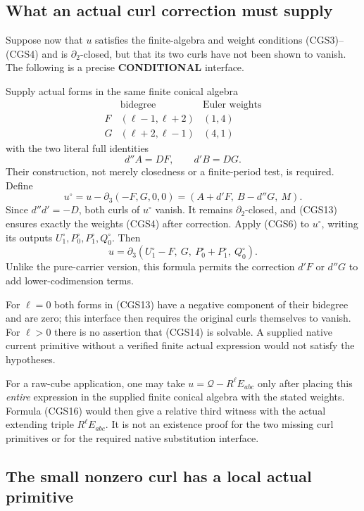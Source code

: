 \subsection{What an actual curl correction must supply}

Suppose now that $u$ satisfies the finite-algebra and weight
conditions (CGS3)--(CGS4) and is $\partial_2$-closed, but that
its two curls have not been shown to vanish.  The following
is a precise \textbf{CONDITIONAL} interface.

Supply actual forms in the same finite conical algebra
\[
 \begin{array}{c|c|c}
       &\text{bidegree}&\text{Euler weights}\\\hline
 F&(\ell-1,\ell+2)&(1,4)\\
 G&(\ell+2,\ell-1)&(4,1)
 \end{array}
 \tag{CGS13}
\]
with the two literal full identities
\[
                         d''A=DF,\qquad d'B=DG.
 \tag{CGS14}
\]
Their construction, not merely closedness or a finite-period
test, is required.  Define
\[
 u^\circ=u-\partial_3(-F,G,0,0)
                       =(A+d'F,\ B-d''G,\ M).
 \tag{CGS15}
\]
Since $d''d'=-D$, both curls of $u^\circ$ vanish.  It remains
$\partial_2$-closed, and (CGS13) ensures exactly the weights
(CGS4) after correction.  Apply (CGS6) to $u^\circ$, writing
its outputs $U_1^\circ,P_0^\circ,P_1^\circ,Q_0^\circ$.
Then
\[
 \boxed{\quad
 u=\partial_3\left(
 U_1^\circ-F,\ G,\ P_0^\circ+P_1^\circ,\ Q_0^\circ
                  \right).
 \quad}
 \tag{CGS16}
\]
Unlike the pure-carrier version, this formula permits the
correction $d'F$ or $d''G$ to add lower-codimension terms.

For $\ell=0$ both forms in (CGS13) have a negative component
of their bidegree and are zero; this interface then requires
the original curls themselves to vanish.  For $\ell>0$
there is no assertion that (CGS14) is solvable.  A supplied
native current primitive without a verified finite actual
expression would not satisfy the hypotheses.

For a raw-cube application, one may take
$u=\mathcal Q-R^\ell E_{abc}$ only after placing this
\emph{entire} expression in the supplied finite conical
algebra with the stated weights.  Formula (CGS16) would then
give a relative third witness with the actual extending
triple $R^\ell E_{abc}$.  It is not an existence proof for
the two missing curl primitives or for the required native
substitution interface.

\subsection{The small nonzero curl has a local actual primitive}

